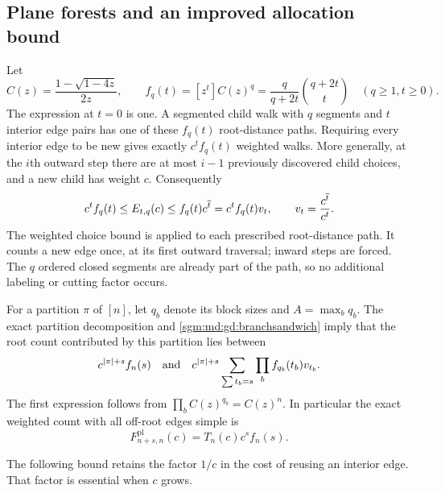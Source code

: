 \documentclass[11pt,letterpaper]{article}
\theoremstyle{remark}\newtheorem{remark}[theorem]{Remark}
\theoremstyle{definition}\newtheorem{definition}[theorem]{Definition}
\begin{document}
\subsection{Plane forests and an improved allocation bound}

Let
\[
 C(z)=\frac{1-\sqrt{1-4z}}{2z},\qquad
 f_q(t)=[z^t]C(z)^q
       =\frac{q}{q+2t}\binom{q+2t}{t}
 \quad(q\ge1,t\ge0).
\]
The expression at $t=0$ is one.  A segmented child walk with $q$
segments and $t$ interior edge pairs has one of these $f_q(t)$
root-distance paths.  Requiring every interior edge to be new gives
exactly $c^tf_q(t)$ weighted walks.  More generally, at the $i$th
outward step there are at most $i-1$ previously discovered child choices,
and a new child has weight $c$.  Consequently
\begin{equation}\label{sgm:md:gd:branchsandwich}
 c^tf_q(t)\le E_{t,q}(c)
 \le f_q(t)c^{\overline{t}}
 =c^tf_q(t)v_t,
 \qquad v_t=\frac{c^{\overline{t}}}{c^t}.
\end{equation}
The weighted choice bound is applied to each prescribed root-distance
path.  It counts a new edge once, at its first outward traversal; inward
steps are forced.  The $q$ ordered closed segments are already part of
the path, so no additional labeling or cutting factor occurs.

For a partition $\pi$ of $[n]$, let $q_b$ denote its block sizes and
$A=\max_bq_b$.  The exact partition decomposition and
\eqref{sgm:md:gd:branchsandwich} imply that the root count contributed by this
partition lies between
\[
 c^{|\pi|+s}f_n(s)
 \quad\hbox{and}\quad
 c^{|\pi|+s}
 \sum_{\sum t_b=s}\prod_b f_{q_b}(t_b)v_{t_b}.
\]
The first expression follows from $\prod_b C(z)^{q_b}=C(z)^n$.
In particular the exact weighted count with all off-root edges simple is
\begin{equation}\label{sgm:md:gd:freshroot}
 F^{\mathrm{pl}}_{n+s,n}(c)=T_n(c)c^sf_n(s).
\end{equation}

The following bound retains the factor $1/c$ in the cost of reusing an
interior edge.  That factor is essential when $c$ grows.
\end{document}
